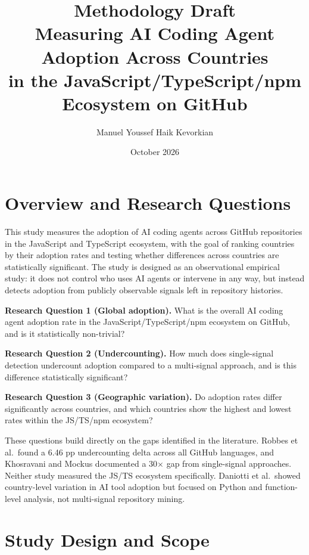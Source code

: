 \documentclass[12pt, a4paper]{article}
\title{%
  \textbf{Methodology Draft}\\[0.4em]
  \large Measuring AI Coding Agent Adoption Across Countries\\
  in the JavaScript/TypeScript/npm Ecosystem on GitHub
}
\author{Manuel Youssef Haik Kevorkian}
\date{October 2026}
\begin{document}
\maketitle
\tableofcontents
\newpage

\section{Overview and Research Questions}

This study measures the adoption of AI coding agents across GitHub repositories
in the JavaScript and TypeScript ecosystem, with the goal of ranking countries
by their adoption rates and testing whether differences across countries are
statistically significant. The study is designed as an observational empirical
study: it does not control who uses AI agents or intervene in any way, but
instead detects adoption from publicly observable signals left in repository
histories.

\textbf{Research Question 1 (Global adoption).}
What is the overall AI coding agent adoption rate in the JavaScript/TypeScript/npm
ecosystem on GitHub, and is it statistically non-trivial?

\textbf{Research Question 2 (Undercounting).}
How much does single-signal detection undercount adoption compared to a
multi-signal approach, and is this difference statistically significant?

\textbf{Research Question 3 (Geographic variation).}
Do adoption rates differ significantly across countries, and which countries
show the highest and lowest rates within the JS/TS/npm ecosystem?

These questions build directly on the gaps identified in the literature.
Robbes et al.\ found a 6.46 pp undercounting delta across all GitHub languages,
and Khosravani and Mockus documented a 30$\times$ gap from single-signal
approaches. Neither study measured the JS/TS ecosystem specifically.
Daniotti et al.\ showed country-level variation in AI tool adoption but focused
on Python and function-level analysis, not multi-signal repository mining.

\section{Study Design and Scope}
\end{document}
